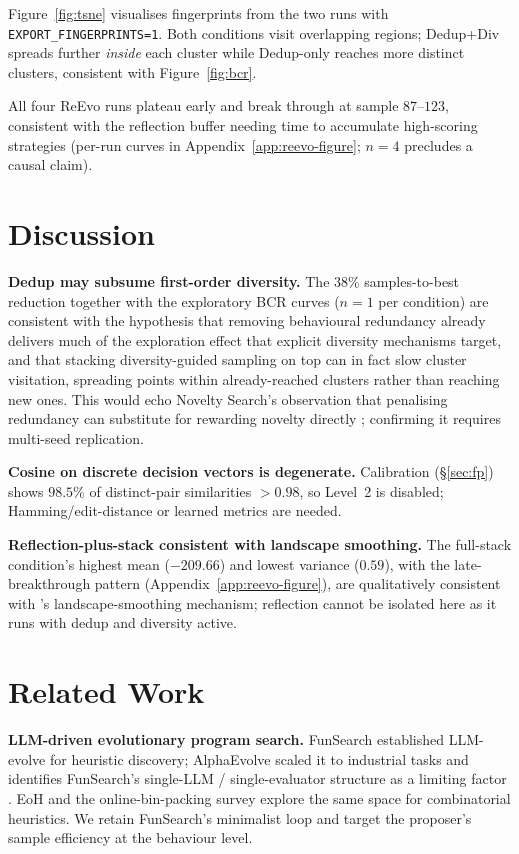 \documentclass{article}
\begin{document}
Figure~\ref{fig:tsne} visualises fingerprints from the two runs with
\texttt{EXPORT\_FINGERPRINTS=1}. Both conditions visit overlapping regions; Dedup+Div
spreads further \emph{inside} each cluster while Dedup-only reaches more distinct
clusters, consistent with Figure~\ref{fig:bcr}.

All four ReEvo runs plateau early and break through at sample $87$--$123$,
consistent with the reflection buffer needing time to accumulate high-scoring
strategies (per-run curves in Appendix~\ref{app:reevo-figure}; $n{=}4$ precludes
a causal claim).

\section{Discussion}
\label{sec:disc}

\textbf{Dedup may subsume first-order diversity.} The $38\%$ samples-to-best
reduction together with the exploratory BCR curves ($n{=}1$ per condition) are
consistent with the hypothesis that removing behavioural redundancy already
delivers much of the exploration effect that explicit diversity mechanisms target,
and that stacking diversity-guided sampling on top can in fact slow cluster
visitation, spreading points within already-reached clusters rather than reaching
new ones. This would echo Novelty Search's observation that penalising redundancy
can substitute for rewarding novelty directly \citep{lehman2011novelty};
confirming it requires multi-seed replication.

\textbf{Cosine on discrete decision vectors is degenerate.} Calibration
(\S\ref{sec:fp}) shows $98.5\%$ of distinct-pair similarities $>0.98$, so
Level~2 is disabled; Hamming/edit-distance or learned metrics are needed.

\textbf{Reflection-plus-stack consistent with landscape smoothing.} The full-stack
condition's highest mean ($-209.66$) and lowest variance ($0.59$), with the
late-breakthrough pattern (Appendix~\ref{app:reevo-figure}), are qualitatively
consistent with \citet{ye2024reevo}'s landscape-smoothing mechanism; reflection
cannot be isolated here as it runs with dedup and diversity active.

\section{Related Work}
\label{sec:related}

\textbf{LLM-driven evolutionary program search.} FunSearch \citep{romera2023mathematical}
established LLM-evolve for heuristic discovery; AlphaEvolve \citep{alphaevolve2025}
scaled it to industrial tasks and identifies FunSearch's single-LLM / single-evaluator
structure as a limiting factor \citep[\S5]{alphaevolve2025}. EoH \citep{liu2024eoh}
and the online-bin-packing survey \citep{sim2025bin} explore the same space for
combinatorial heuristics. We retain FunSearch's minimalist loop and target the
proposer's sample efficiency at the behaviour level.
\end{document}
